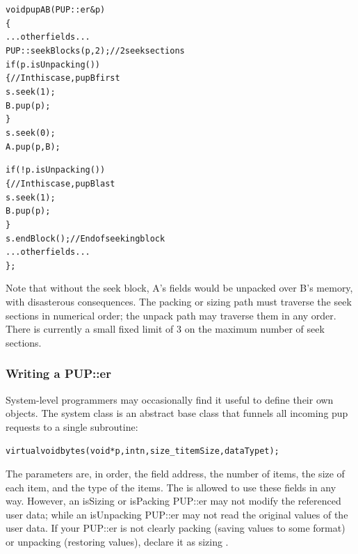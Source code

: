 \begin{alltt}
void pupAB(PUP::er &p)
\{
  ... other fields ...
  PUP::seekBlock s(p,2); //2 seek sections
  if (p.isUnpacking()) 
  \{//In this case, pup B first
    s.seek(1);
    B.pup(p);
  \}
  s.seek(0);
  A.pup(p,B);
  
  if (!p.isUnpacking()) 
  \{//In this case, pup B last
    s.seek(1);
    B.pup(p);
  \}
  s.endBlock(); //End of seeking block
  ... other fields ...
\};
\end{alltt}

Note that without the seek block, A's fields would be unpacked
over B's memory, with disasterous consequences.
The packing or sizing path must traverse the seek sections
in numerical order; the unpack path may traverse them in any
order.  There is currently a small fixed limit of 3 on the 
maximum number of seek sections.


\subsubsection{Writing a PUP::er}
System-level programmers may occasionally find it useful to define
their own  objects.  The system  class is 
an abstract base class that funnels all incoming pup requests
to a single subroutine:

\begin{alltt}
    virtual void bytes(void *p,int n,size\_t itemSize,dataType t);
\end{alltt}

The parameters are, in order, the field address, the number of items,
the size of each item, and the type of the items. The 
is allowed to use these fields in any way.  However, an isSizing
or isPacking PUP::er may not modify the referenced user data; 
while an isUnpacking PUP::er may not read the original values of 
the user data.  If your PUP::er is not clearly packing (saving values
to some format) or unpacking (restoring values), declare it as 
sizing .



